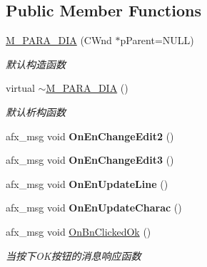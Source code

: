 \subsection*{Public Member Functions}
\begin{DoxyCompactItemize}
\item 
\mbox{\label{class_m___p_a_r_a___d_i_a_a48afe90e65a6b5b795660771a979dead}} 
\hyperlink{class_m___p_a_r_a___d_i_a_a48afe90e65a6b5b795660771a979dead}{M\+\_\+\+P\+A\+R\+A\+\_\+\+D\+IA} (C\+Wnd $\ast$p\+Parent=N\+U\+LL)
\begin{DoxyCompactList}\small\item\em 默认构造函数 \end{DoxyCompactList}\item 
\mbox{\label{class_m___p_a_r_a___d_i_a_a773b615a0195eef82f905a622b986730}} 
virtual \hyperlink{class_m___p_a_r_a___d_i_a_a773b615a0195eef82f905a622b986730}{$\sim$\+M\+\_\+\+P\+A\+R\+A\+\_\+\+D\+IA} ()
\begin{DoxyCompactList}\small\item\em 默认析构函数 \end{DoxyCompactList}\item 
\mbox{\label{class_m___p_a_r_a___d_i_a_a65b051cfe602cb62465fbe415c5f9855}} 
afx\+\_\+msg void {\bfseries On\+En\+Change\+Edit2} ()
\item 
\mbox{\label{class_m___p_a_r_a___d_i_a_a27389e0288e070d6b6754db0a8e4d46a}} 
afx\+\_\+msg void {\bfseries On\+En\+Change\+Edit3} ()
\item 
\mbox{\label{class_m___p_a_r_a___d_i_a_ada46b2ff3644d52d8afeb67bdae02c7b}} 
afx\+\_\+msg void {\bfseries On\+En\+Update\+Line} ()
\item 
\mbox{\label{class_m___p_a_r_a___d_i_a_af5179b1264d23370b538c5a946122b32}} 
afx\+\_\+msg void {\bfseries On\+En\+Update\+Charac} ()
\item 
\mbox{\label{class_m___p_a_r_a___d_i_a_afffa042b90b31b6d38bf33792096d908}} 
afx\+\_\+msg void \hyperlink{class_m___p_a_r_a___d_i_a_afffa042b90b31b6d38bf33792096d908}{On\+Bn\+Clicked\+Ok} ()
\begin{DoxyCompactList}\small\item\em 当按下\+O\+K按钮的消息响应函数 \end{DoxyCompactList}\end{DoxyCompactItemize}
